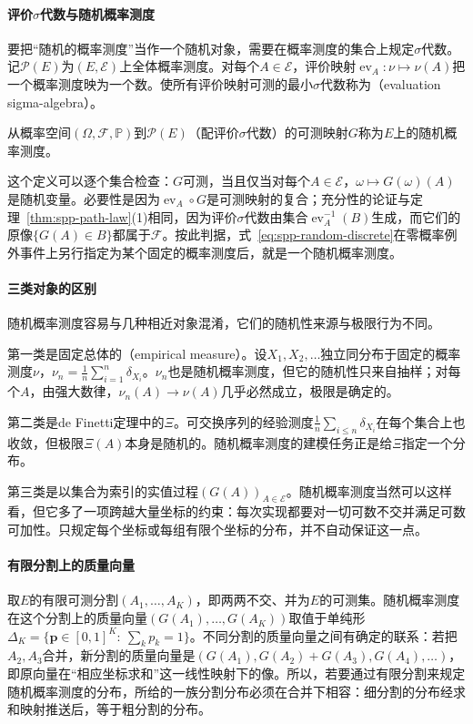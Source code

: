 \paragraph{评价$\sigma$代数与随机概率测度}
要把“随机的概率测度”当作一个随机对象，需要在概率测度的集合上规定$\sigma$代数。记$\mathcal P(E)$为$(E,\mathcal E)$上全体概率测度。对每个$A\in\mathcal E$，评价映射$\operatorname{ev}_A:\nu\mapsto\nu(A)$把一个概率测度映为一个数。使所有评价映射可测的最小$\sigma$代数称为（evaluation sigma-algebra）。

\begin{definition}[随机概率测度]
\label{def:spp-random-probability-measure}
从概率空间$(\Omega,\mathcal F,\mathbb P)$到$\mathcal P(E)$（配评价$\sigma$代数）的可测映射$G$称为$E$上的随机概率测度。
\end{definition}

这个定义可以逐个集合检查：$G$可测，当且仅当对每个$A\in\mathcal E$，$\omega\mapsto G(\omega)(A)$是随机变量。必要性是因为$\operatorname{ev}_A\circ G$是可测映射的复合；充分性的论证与定理~\ref{thm:spp-path-law}(1)相同，因为评价$\sigma$代数由集合$\operatorname{ev}_A^{-1}(B)$生成，而它们的原像$\{G(A)\in B\}$都属于$\mathcal F$。按此判据，式~\eqref{eq:spp-random-discrete}在零概率例外事件上另行指定为某个固定的概率测度后，就是一个随机概率测度。

\paragraph{三类对象的区别}
随机概率测度容易与几种相近对象混淆，它们的随机性来源与极限行为不同。

第一类是固定总体的（empirical measure）。设$X_1,X_2,\ldots$独立同分布于固定的概率测度$\nu$，$\nu_n=\frac1n\sum_{i=1}^n\delta_{X_i}$。$\nu_n$也是随机概率测度，但它的随机性只来自抽样；对每个$A$，由强大数律，$\nu_n(A)\to\nu(A)$几乎必然成立，极限是确定的。

第二类是de Finetti定理中的$\Xi$。可交换序列的经验测度$\frac1n\sum_{i\le n}\delta_{X_i}$在每个集合上也收敛，但极限$\Xi(A)$本身是随机的。随机概率测度的建模任务正是给$\Xi$指定一个分布。

第三类是以集合为索引的实值过程$(G(A))_{A\in\mathcal E}$。随机概率测度当然可以这样看，但它多了一项跨越大量坐标的约束：每次实现都要对一切可数不交并满足可数可加性。只规定每个坐标或每组有限个坐标的分布，并不自动保证这一点。

\paragraph{有限分割上的质量向量}
取$E$的有限可测分割$(A_1,\ldots,A_K)$，即两两不交、并为$E$的可测集。随机概率测度在这个分割上的质量向量$(G(A_1),\ldots,G(A_K))$取值于单纯形$\Delta_K=\{\bm p\in[0,1]^K:\ \sum_kp_k=1\}$。不同分割的质量向量之间有确定的联系：若把$A_2,A_3$合并，新分割的质量向量是$(G(A_1),G(A_2)+G(A_3),G(A_4),\ldots)$，即原向量在“相应坐标求和”这一线性映射下的像。所以，若要通过有限分割来规定随机概率测度的分布，所给的一族分割分布必须在合并下相容：细分割的分布经求和映射推送后，等于粗分割的分布。

